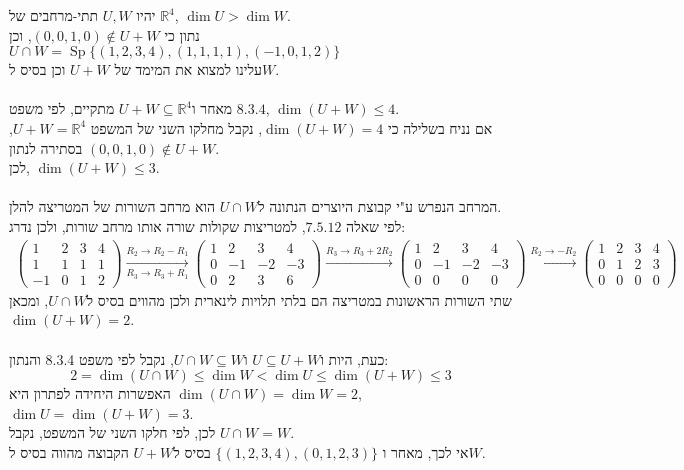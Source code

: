 \documentclass{article}
\DeclareMathOperator\Sp{Sp}
\def\reals{\mathbb{R}}
\begin{document}
יהיו $U,W$ תתי-מרחבים של $\reals^4$, $\dim U>\dim W$. \\
נתון כי $(0,0,1,0)\notin U+W$, וכן $U\cap W=\Sp\{(1,2,3,4), (1,1,1,1), (-1,0,1,2)\}$ \\
עלינו למצוא את המימד של $U+W$ וכן בסיס ל$W$.
\\\\
מאחר ו$U+W\subseteq \reals^4$
מתקיים, לפי משפט $8.3.4$, $\dim(U+W)\leq 4$.\\
אם נניח בשלילה כי $\dim(U+W)=4$, נקבל מחלקו השני של המשפט $U+W=\reals^4$, בסתירה לנתון $(0,0,1,0)\notin U+W$.\\
לכן, $\dim(U+W)\leq 3$.
\\\\
המרחב הנפרש ע"י קבוצת היוצרים הנתונה ל$U\cap W$ הוא מרחב השורות של המטריצה להלן. \\
לפי שאלה $7.5.12$, למטריצות שקולות שורה אותו מרחב שורות, ולכן נדרג:
\begin{align*}
    \begin{pmatrix}
        1  & 2 & 3 & 4 \\
        1  & 1 & 1 & 1 \\
        -1 & 0 & 1 & 2
    \end{pmatrix}
    \xrightarrow[R_3\rightarrow R_3+R_1]{R_2\rightarrow R_2-R_1}
    \begin{pmatrix}
        1 & 2  & 3  & 4  \\
        0 & -1 & -2 & -3 \\
        0 & 2  & 3  & 6
    \end{pmatrix}
    \xrightarrow[]{R_3\rightarrow R_3+2R_2}
    \begin{pmatrix}
        1 & 2  & 3  & 4  \\
        0 & -1 & -2 & -3 \\
        0 & 0  & 0  & 0
    \end{pmatrix}
    \xrightarrow[]{R_2\rightarrow -R_2}
    \begin{pmatrix}
        1 & 2 & 3 & 4 \\
        0 & 1 & 2 & 3 \\
        0 & 0 & 0 & 0
    \end{pmatrix}
\end{align*}
שתי השורות הראשונות במטריצה הם בלתי תלויות לינארית ולכן מהווים בסיס ל$U\cap W$, ומכאן $\dim(U+W)=2$.
\\\\
כעת, היות ו$U\subseteq U+W$ ו$U\cap W\subseteq W$, נקבל לפי משפט 8.3.4 והנתון:
\[
    2=\dim(U\cap W)\leq \dim W < \dim U \leq \dim (U+W)\leq 3
\]
האפשרות היחידה לפתרון היא $\dim(U\cap W)=\dim W=2$, $\dim U = \dim(U+W)=3$. \\
לכן, לפי חלקו השני של המשפט, נקבל $U\cap W = W$. \\
אי לכך, מאחר ו $\{(1,2,3,4), (0,1,2,3)\}$ בסיס ל$U+W$ הקבוצה מהווה בסיס ל$W$.
\end{document}
